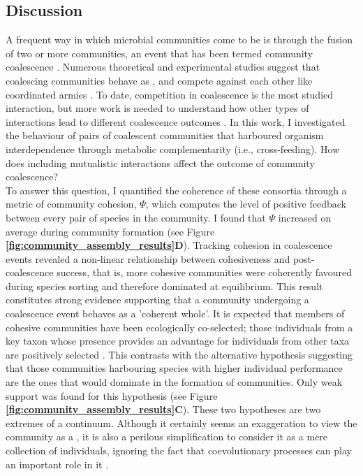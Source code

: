 \documentclass[titlepage,11pt]{article}
\begin{document}
\begin{linenumbers}
\begin{singlespace}
		\section{Discussion}
			A frequent way in which microbial communities come to be is through the fusion of two or more communities, an event that has been termed community coalescence  \citep{Rillig2015}. Numerous theoretical and experimental studies suggest that coalescing communities behave as , and compete against each other like coordinated armies \citep{Gilpin1994, Toquenaga1997, Livingston2013, Tikhonov2016, Tikhonov2017, Sierocinski2017, Lu2018}. To date, competition in coalescence is the most studied interaction, but more work is needed to understand how other types of interactions lead to different coalescence outcomes \citep{Castledine2020}. In this work, I investigated the behaviour of pairs of coalescent communities that harboured organism interdependence through metabolic complementarity (i.e., cross-feeding). How does including mutualistic interactions affect the outcome of community coalescence?\\
			To answer this question, I quantified the coherence of these consortia through a metric of community cohesion, $ \Psi $, which computes the level of positive feedback between every pair of species in the community. I found that $ \Psi $ increased on average  during community formation (see Figure \textbf{\ref{fig:community_assembly_results}D}). Tracking cohesion in coalescence events revealed a non-linear relationship between cohesiveness and post-coalescence success, that is, more cohesive communities were coherently favoured during species sorting and therefore dominated at equilibrium. This result constitutes strong evidence supporting that a community undergoing a coalescence event behaves as a 'coherent whole'. It is expected that members of cohesive communities have been ecologically co-selected; those individuals from a key taxon whose presence provides an advantage for individuals from other taxa are positively selected \citep{Sierocinski2017}. This contrasts with the alternative hypothesis suggesting that those communities harbouring species with higher individual performance are the ones that would dominate in the formation of communities. Only weak support was found for this hypothesis (see Figure \textbf{\ref{fig:community_assembly_results}C}). These two hypotheses are two extremes of a continuum. Although it certainly seems an exaggeration to view the community as a , it is also a perilous simplification to consider it as a mere collection of individuals, ignoring the fact that coevolutionary processes can play an important role in it \citep{Rillig2017}.\\

\end{singlespace}
\end{linenumbers}
\end{document}

